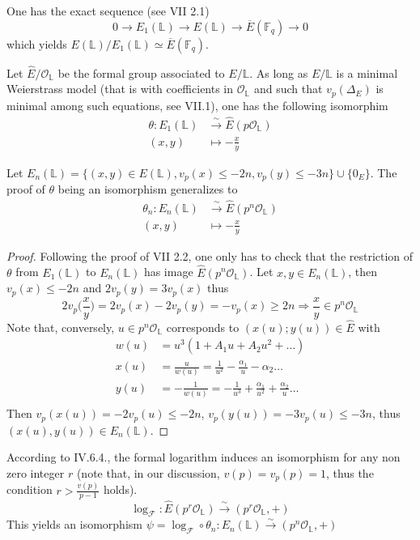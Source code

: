 \documentclass[10pt]{article}
\theoremstyle{definition}
\newcommand{\F}{\mathbb{F}}
\renewcommand{\L}{\mathbb{L}}
\begin{document}
\noindent One has the exact sequence (see \cite{Silverman:EC} VII 2.1)
\[ 0 \to E_1(\L) \to E(\L) \to \overline{E}(\F_q) \to 0 \]
which yields $E(\L) / E_1(\L) \simeq \overline{E}(\F_q)$.

Let $\hat{E} / \mathcal{O}_{\L}$ be the formal group associated to $E/\L$.
As long as $E/ \L$ is a minimal Weierstrass model (that is with coefficients in $\mathcal{O}_{\L}$ and such that $v_p(\Delta_{E})$ is minimal among such equations, see \cite{Silverman:EC} VII.1), one has the following isomorphim 
\begin{align*} \theta : E_1(\L) &\xrightarrow{\sim} \hat{E}(p\mathcal{O}_{\L})\\
                   (x,y)& \mapsto - \frac{x}{y} 
\end{align*} 

\noindent Let $E_n(\L)= \lbrace (x,y) \in E(\L), v_p(x) \leq -2n, v_p(y) \leq -3n \rbrace \cup \lbrace 0_E \rbrace$.
The proof of $\theta$ being an isomorphism generalizes to 
\begin{align*} \theta_n : E_n(\L) &\xrightarrow{\sim} \hat{E}(p^n\mathcal{O}_{\L})\\
                   (x,y)& \mapsto - \frac{x}{y} 
\end{align*} 

\begin{proof}
Following the proof of \cite{Silverman:EC} VII 2.2, one only has to check that the restriction of $\theta$ from $E_1(\L)$ to $E_n(\L)$ has image  $\hat{E}(p^n\mathcal{O}_{\L})$.
Let $x,y \in E_n(\L)$, then $v_p(x) \leq -2n $ and $2v_p(y) = 3v_p(x)$ thus
\[ 2v_p\big(\frac{x}{y}\big) = 2 v_p(x) - 2v_p(y) = -v_p(x) \geq 2n  \Rightarrow \frac{x}{y} \in p^n\mathcal{O}_{\L} \]
Note that, conversely, $ u \in p^n \mathcal{O}_{\L}$ corresponds to $(x(u);y(u)) \in \hat{E}$ with
\begin{align*}
w(u) &= u^3(1+A_1u+A_2u^2+ \dots )\\
x(u) & = \frac{u}{w(u)}= \frac{1}{u^2} - \frac{\alpha_1}{u} - \alpha_2 \dots \\
y(u) &= -\frac{1}{w(u)} = -\frac{1}{u^3} + \frac{\alpha_1}{u^2} + \frac{ \alpha_2}{u} \dots \\
\end{align*}
Then $v_p(x(u)) = -2v_p(u) \leq -2n$, $v_p(y(u)) = -3v_p(u) \leq -3n$, thus $(x(u),y(u)) \in E_n(\L)$.
\end{proof}

According to \cite{Silverman:EC} IV.6.4., the formal logarithm induces an isomorphism for any non zero integer $r$ (note that, in our discussion, $v(p) =v_p(p)= 1$, thus the condition $r > \frac{v(p)}{p-1}$ holds). 
\[ \log_{\mathcal{F}} : \hat{E}(p^r\mathcal{O}_{\L}) \xrightarrow{\sim} (p^r\mathcal{O}_{\L},+) \]
This yields an isomorphism $\psi = \log_{\mathcal{F}} \circ \theta_n : E_n(\L) \xrightarrow{\sim} (p^n\mathcal{O}_{\L},+)$
\end{document}
